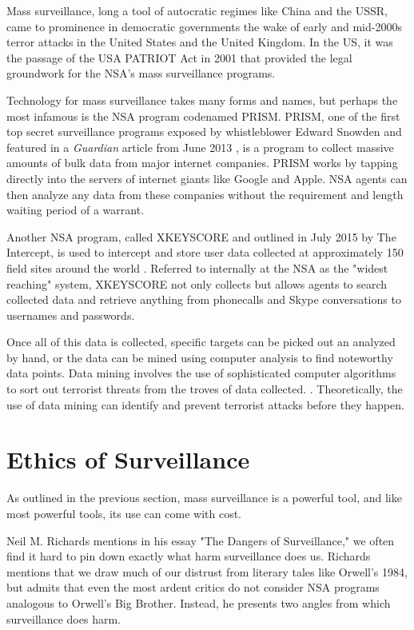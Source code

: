 \documentclass{sig-alternate-05-2015}
\begin{document}
Mass surveillance, long a tool of autocratic regimes like China and the USSR, 
came to prominence in democratic governments the wake of early and mid-2000s 
terror attacks in the United States and the United Kingdom. In the US, it was
the passage of the USA PATRIOT Act in 2001 that provided the legal groundwork
for the NSA's mass surveillance programs.

Technology for mass surveillance takes many forms and names, but perhaps the
most infamous is the NSA program codenamed PRISM. PRISM, one of the first top
secret surveillance programs exposed by whistleblower Edward Snowden and
featured in a \textit{Guardian} article from June 2013 \cite{guardian}, is a
program to collect massive amounts of bulk data from major internet companies.
PRISM works by tapping directly into the servers of internet giants like
Google and Apple. NSA agents can then analyze any data from these companies
without the requirement and length waiting period of a warrant.

Another NSA program, called XKEYSCORE and outlined in July 2015 by The
Intercept, is used to intercept and store user data collected at  approximately
150 field sites around the world \cite{xkeyscore}. Referred to internally at
the NSA as the "widest reaching" system, XKEYSCORE not only collects but allows
agents to search collected data and retrieve anything from phonecalls and Skype
conversations to usernames and passwords.

Once all of this data is collected, specific targets can be picked out an
analyzed by hand, or the data can be mined using computer analysis to find
noteworthy data points. Data mining involves the use of
sophisticated computer algorithms to sort out terrorist threats from the troves
of data collected. \cite{mining}. Theoretically, the use of data mining can
identify and prevent terrorist attacks before they happen.

\section{Ethics of Surveillance}

As outlined in the previous section, mass surveillance is a powerful tool, and
like most powerful tools, its use can come with cost. 

Neil M. Richards mentions in his essay "The Dangers of Surveillance,"
\cite{richards} we often find it hard to pin down exactly what harm
surveillance does us. Richards mentions that we draw much of our distrust from
literary tales like Orwell's 1984, but admits that even the most ardent critics
do not consider NSA programs analogous to Orwell's Big Brother.  Instead, he
presents two angles from which surveillance does harm. 
\end{document}
